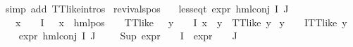 \begin{isabellebody}
\ {\isacharparenleft}{\kern0pt}simp\ add{\isacharcolon}{\kern0pt}\ TT{\isacharunderscore}{\kern0pt}like{\isachardot}{\kern0pt}intros{\isacharparenleft}{\kern0pt}{}{\isacharparenright}{\kern0pt}{\isacharparenright}{\kern0pt}\isanewline
{}\isamarkupfalse%
%
\endisatagproof
{\isafoldproof}%
%
\isadelimproof
\isanewline
%
\endisadelimproof
\isanewline
{}\isamarkupfalse%
\ revivals{\isacharunderscore}{\kern0pt}pos{\isacharcolon}{\kern0pt}\isanewline
\ \ \ {\isachardoublequoteopen}less{\isacharunderscore}{\kern0pt}eq{\isacharunderscore}{\kern0pt}t\ {\isacharparenleft}{\kern0pt}expr\ {\isacharparenleft}{\kern0pt}hml{\isacharunderscore}{\kern0pt}conj\ I\ J\ {\isasymPhi}{\isacharparenright}{\kern0pt}{\isacharparenright}{\kern0pt}\ {\isacharparenleft}{\kern0pt}{\isasyminfinity}{\isacharcomma}{\kern0pt}\ {}{\isacharcomma}{\kern0pt}\ {}{\isacharcomma}{\kern0pt}\ {}{\isacharcomma}{\kern0pt}\ {}{\isacharcomma}{\kern0pt}\ {}{\isacharparenright}{\kern0pt}{\isachardoublequoteclose}\isanewline
\ \ \ {\isachardoublequoteopen}{\isacharparenleft}{\kern0pt}{\isasymexists}x\ {\isasymin}\ {\isacharparenleft}{\kern0pt}{\isasymPhi}\ {\isacharbackquote}{\kern0pt}\ I{\isacharparenright}{\kern0pt}{\isachardot}{\kern0pt}\ {\isacharparenleft}{\kern0pt}{\isasymexists}{\isasymalpha}\ {\isasymchi}{\isachardot}{\kern0pt}\ {\isacharparenleft}{\kern0pt}x\ {\isacharequal}{\kern0pt}\ hml{\isacharunderscore}{\kern0pt}pos\ {\isasymalpha}\ {\isasymchi}{\isacharparenright}{\kern0pt}\ {\isasymand}\ TT{\isacharunderscore}{\kern0pt}like\ {\isasymchi}{\isacharparenright}{\kern0pt}\ {\isasymand}\ {\isacharparenleft}{\kern0pt}{\isasymforall}y\ {\isasymin}\ {\isacharparenleft}{\kern0pt}{\isasymPhi}\ {\isacharbackquote}{\kern0pt}\ I{\isacharparenright}{\kern0pt}{\isachardot}{\kern0pt}\ x\ {\isasymnoteq}\ y\ {\isasymlongrightarrow}\ TT{\isacharunderscore}{\kern0pt}like\ y{\isacharparenright}{\kern0pt}{\isacharparenright}{\kern0pt}\isanewline
{\isasymor}\ {\isacharparenleft}{\kern0pt}{\isasymforall}y\ {\isasymin}\ {\isacharparenleft}{\kern0pt}{\isasymPhi}\ {\isacharbackquote}{\kern0pt}\ I{\isacharparenright}{\kern0pt}{\isachardot}{\kern0pt}TT{\isacharunderscore}{\kern0pt}like\ y{\isacharparenright}{\kern0pt}{\isachardoublequoteclose}\isanewline
%
\isadelimproof
%
\endisadelimproof
%
\isatagproof
{}\isamarkupfalse%
{\isacharminus}{\kern0pt}\isanewline
\ \ \isamarkupfalse%
\ {\isachardoublequoteopen}expr{\isacharunderscore}{\kern0pt}{}\ {\isacharparenleft}{\kern0pt}hml{\isacharunderscore}{\kern0pt}conj\ I\ J\ {\isasymPhi}{\isacharparenright}{\kern0pt}\ {\isacharequal}{\kern0pt}\ {}\ {\isacharplus}{\kern0pt}\ Sup\ {\isacharparenleft}{\kern0pt}{\isacharparenleft}{\kern0pt}expr{\isacharunderscore}{\kern0pt}{}\ {\isasymcirc}\ {\isasymPhi}{\isacharparenright}{\kern0pt}\ {\isacharbackquote}{\kern0pt}\ I\ {\isasymunion}\ {\isacharparenleft}{\kern0pt}expr{\isacharunderscore}{\kern0pt}{}\ {\isasymcirc}\ {\isasymPhi}{\isacharparenright}{\kern0pt}\ {\isacharbackquote}{\kern0pt}\ J{\isacharparenright}{\kern0pt}{\isachardoublequoteclose}\isanewline

\end{isabellebody}
